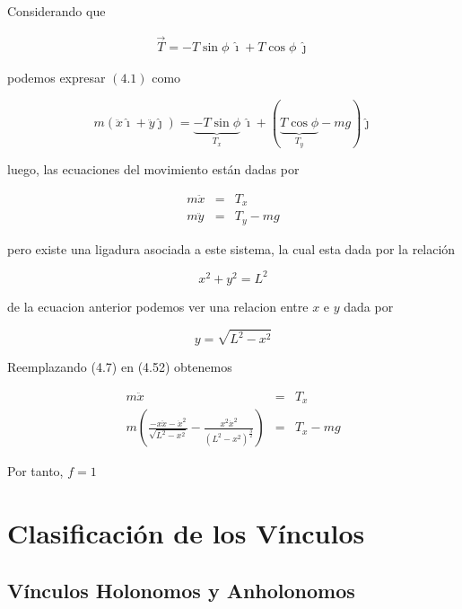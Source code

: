 \documentclass[12pt]{report}
\begin{document}
Considerando que 

\begin{eqnarray}
\vec{T}=-T\sin{\phi} \ \hat{\imath}+T\cos{\phi} \ \hat{\jmath}
\end{eqnarray}

podemos expresar $(4.1)$ como

\begin{equation}
m \left( \ddot{x} \hat{\imath} + \ddot{y} \hat{\jmath} \right) = \underbrace{-T\sin{\phi}}_{T_x} \ \hat{\imath} + \left( \underbrace{T\cos{\phi}}_{T_y} - mg \right) \hat{\jmath}
\end{equation} 


luego, las ecuaciones del movimiento están dadas por

\begin{eqnarray}
m\ddot{x}&=&T_x \\
m\ddot{y}&=&T_y - mg
\end{eqnarray}

pero existe una ligadura asociada a este sistema, la cual esta dada por la relación

\begin{equation}
x^2 + y^2 = L^2
\end{equation}

de la ecuacion anterior podemos ver una relacion entre $x$ e $y$  dada por

\begin{equation}
y=\sqrt{L^2 - x^2}
\end{equation}


Reemplazando (4.7) en (4.52) obtenemos

\begin{eqnarray}
m\ddot{x}&=&T_x \\
m\left( \frac{-x \ddot{x}-\dot{x}^2}{\sqrt{L^2 - x^2}}- \frac{x^2 \dot{x}^2}{\left(L^2 - x^2\right)^{\frac{3}{2}}} \right)&=& T_x - mg
\end{eqnarray}

Por tanto,  $f=1$




\section{Clasificación de los Vínculos}

\subsection{Vínculos Holonomos y Anholonomos}
\end{document}

